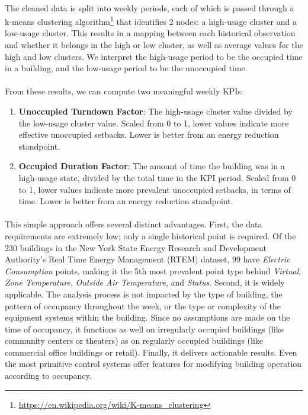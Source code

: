 \documentclass[a4paper]{article}
\begin{document}
\paragraph{}
The cleaned data is split into weekly periods, each of which is passed through a k-means clustering algorithm\footnote{\url{https://en.wikipedia.org/wiki/K-means\_clustering}} that identifies 2 nodes: a high-usage cluster and a low-usage cluster. This results in a mapping between each historical observation and whether it belongs in the high or low cluster, as well as average values for the high and low clusters. We interpret the high-usage period to be the occupied time in a building, and the low-usage period to be the unoccupied time.

\paragraph{}
From these results, we can compute two meaningful weekly KPIs:
\begin{enumerate}
\item{\textbf{Unoccupied Turndown Factor}: The high-usage cluster value divided by the low-usage cluster value. Scaled from 0 to 1, lower values indicate more effective unoccupied setbacks. Lower is better from an energy reduction standpoint.}
\item{\textbf{Occupied Duration Factor}: The amount of time the building was in a high-usage state, divided by the total time in the KPI period. Scaled from 0 to 1, lower values indicate more prevalent unoccupied setbacks, in terms of time.  Lower is better from an energy reduction standpoint.}
\end{enumerate}

\paragraph{}
This simple approach offers several distinct advantages. First, the data requirements are extremely low; only a single historical point is required. Of the 230 buildings in the New York State Energy Research and Development Authority's Real Time Energy Management (RTEM) dataset, 99 have \textit{Electric Consumption} points, making it the 5th most prevalent point type behind \textit{Virtual}, \textit{Zone Temperature}, \textit{Outside Air Temperature}, and \textit{Status}. Second, it is widely applicable. The analysis process is not impacted by the type of building, the pattern of occupancy throughout the week, or the type or complexity of the equipment systems within the building. Since no assumptions are made on the time of occupancy, it functions as well on irregularly occupied buildings (like community centers or theaters) as on regularly occupied buildings (like commercial office buildings or retail). Finally, it delivers actionable results. Even the most primitive control systems offer features for modifying building operation according to occupancy.
\end{document}
